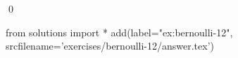 
\begin{ex} 
  \label{ex:bernoulli-12}
  
  \qed
\end{ex} 
\begin{python0}
from solutions import *
add(label="ex:bernoulli-12",
    srcfilename='exercises/bernoulli-12/answer.tex') 
\end{python0}
